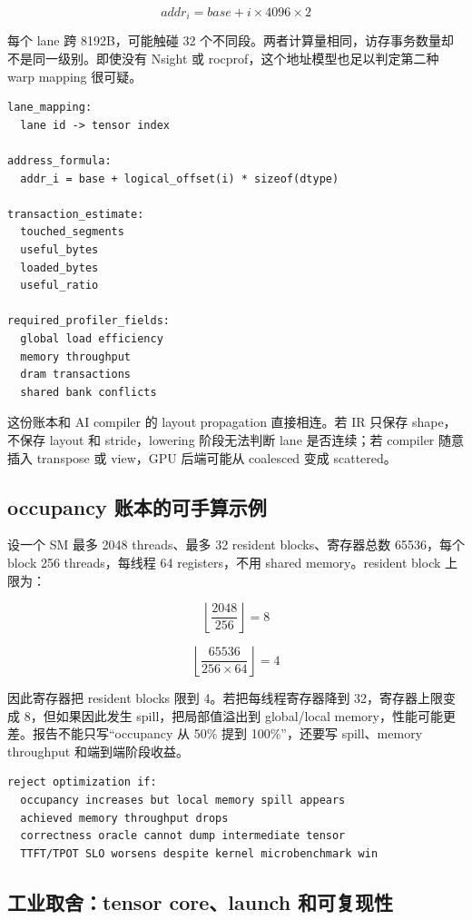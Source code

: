 \[
addr_i = base + i \times 4096 \times 2
\]

每个 lane 跨 8192B，可能触碰 32 个不同段。两者计算量相同，访存事务数量却不是同一级别。即使没有 Nsight 或 rocprof，这个地址模型也足以判定第二种 warp mapping 很可疑。

\begin{lstlisting}[numbers=none,caption={GPU 地址账本检查表}]
lane_mapping:
  lane id -> tensor index

address_formula:
  addr_i = base + logical_offset(i) * sizeof(dtype)

transaction_estimate:
  touched_segments
  useful_bytes
  loaded_bytes
  useful_ratio

required_profiler_fields:
  global load efficiency
  memory throughput
  dram transactions
  shared bank conflicts
\end{lstlisting}

这份账本和 AI compiler 的 layout propagation 直接相连。若 IR 只保存 shape，不保存 layout 和 stride，lowering 阶段无法判断 lane 是否连续；若 compiler 随意插入 transpose 或 view，GPU 后端可能从 coalesced 变成 scattered。

\subsection{occupancy 账本的可手算示例}

设一个 SM 最多 2048 threads、最多 32 resident blocks、寄存器总数 65536，每个 block 256 threads，每线程 64 registers，不用 shared memory。resident block 上限为：

\[
\left\lfloor\frac{2048}{256}\right\rfloor = 8
\]

\[
\left\lfloor\frac{65536}{256 \times 64}\right\rfloor = 4
\]

因此寄存器把 resident blocks 限到 4。若把每线程寄存器降到 32，寄存器上限变成 8，但如果因此发生 spill，把局部值溢出到 global/local memory，性能可能更差。报告不能只写“occupancy 从 50\% 提到 100\%”，还要写 spill、memory throughput 和端到端阶段收益。

\begin{lstlisting}[numbers=none,caption={occupancy 报告中的拒绝条件}]
reject optimization if:
  occupancy increases but local memory spill appears
  achieved memory throughput drops
  correctness oracle cannot dump intermediate tensor
  TTFT/TPOT SLO worsens despite kernel microbenchmark win
\end{lstlisting}

\subsection{工业取舍：tensor core、launch 和可复现性}

